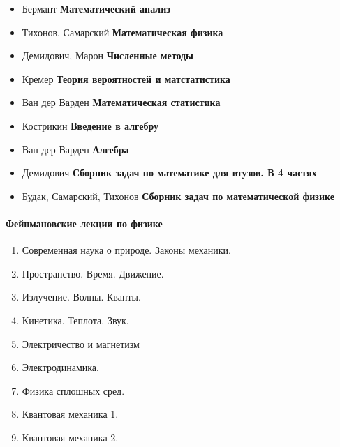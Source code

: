 


\begin{itemize}[nosep]
  \item Бермант \textbf{Математический анализ}\ \cite{bermant}
  \item Тихонов, Самарский \textbf{Математическая физика}\ \cite{ts,tszad}
  \item Демидович, Марон \textbf{Численные методы}\ \cite{demacalc,demanum}
  \item Кремер \textbf{Теория вероятностей и матстатистика}\ \cite{kremer}
  \item Ван дер Варден \textbf{Математическая статистика}\ \cite{varver}
  \item Кострикин \textbf{Введение в алгебру}\ \cite{kostalg,kostlin}
  \item Ван дер Варден \textbf{Алгебра}\ \cite{vanalg}
\end{itemize}
\bigskip
\begin{itemize}[nosep]
  \item Демидович \textbf{Сборник задач по математике для втузов. В 4 частях}\
  \cite{dema1,dema2,dema3,dema4}
  \item Будак, Самарский, Тихонов \textbf{Сборник задач по математической
  физике}\
  \cite{tszad}
\end{itemize}

\paragraph{Фейнмановские лекции по физике}
\begin{enumerate}[nosep]
  \item Современная наука о природе. Законы механики.\ \cite{fein1}
  \item Пространство. Время. Движение.\ \cite{fein2}
  \item Излучение. Волны. Кванты.\ \cite{fein3}
  \item Кинетика. Теплота. Звук.\ \cite{fein4}
  \item Электричество и магнетизм\ \cite{fein5}
  \item Электродинамика.\ \cite{fein6}
  \item Физика сплошных сред.\ \cite{fein7}
  \item Квантовая механика 1.\ \cite{fein8}
  \item Квантовая механика 2.\ \cite{fein9}
\end{enumerate}
\bigskip

